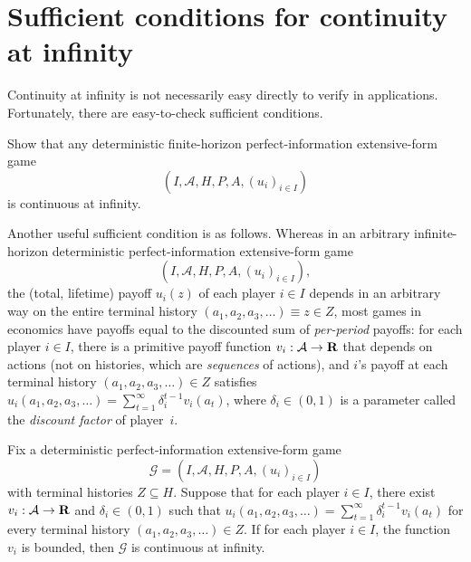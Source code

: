 \section{Sufficient conditions for continuity at infinity}
\label{osdp:suff}

Continuity at infinity is not necessarily easy directly to verify in applications. Fortunately, there are easy-to-check sufficient conditions.

\begin{exercise}
	\label{exercise:conts_infty_finite}
	Show that any deterministic finite-horizon perfect-information extensive-form game
	\begin{equation*}
		(I,\mathcal{A},H,P,A,(u_i)_{i \in I}) 
	\end{equation*}
	is continuous at infinity.
\end{exercise}

Another useful sufficient condition is as follows. Whereas in an arbitrary infinite-horizon deterministic perfect-information extensive-form game
%
\begin{equation*}
	(I,\mathcal{A},H,P,A,(u_i)_{i \in I}) ,
\end{equation*}
%
the (total, lifetime) payoff $u_i(z)$ of each player $i \in I$ depends in an arbitrary way on the entire terminal history $(a_1,a_2,a_3,\dots) \equiv z \in Z$, most games in economics have payoffs equal to the discounted sum of \emph{per-period} payoffs: for each player $i \in I$, there is a primitive payoff function $v_i : \mathcal{A} \to \mathbf{R}$ that depends on actions (not on histories, which are \emph{sequences} of actions), and $i$'s payoff at each terminal history $(a_1,a_2,a_3,\dots) \in Z$ satisfies $u_i(a_1,a_2,a_3,\dots) = \sum_{t=1}^\infty \delta_i^{t-1} v_i(a_t)$, where $\delta_i \in (0,1)$ is a parameter called the \emph{discount factor} of player~$i$.

\begin{proposition}
	\label{proposition:conts_infty_disc}
	Fix a deterministic perfect-information extensive-form game
	\begin{equation*}
		\mathcal{G} = (I,\mathcal{A},H,P,A,(u_i)_{i \in I}) 
	\end{equation*}
	with terminal histories $Z \subseteq H$. Suppose that for each player $i \in I$, there exist $v_i : \mathcal{A} \to \mathbf{R}$ and $\delta_i \in (0,1)$ such that $u_i(a_1,a_2,a_3,\dots) = \sum_{t=1}^\infty \delta_i^{t-1} v_i(a_t)$ for every terminal history $(a_1,a_2,a_3,\dots) \in Z$. If for each player $i \in I$, the function $v_i$ is bounded, then $\mathcal{G}$ is continuous at infinity.
\end{proposition}

